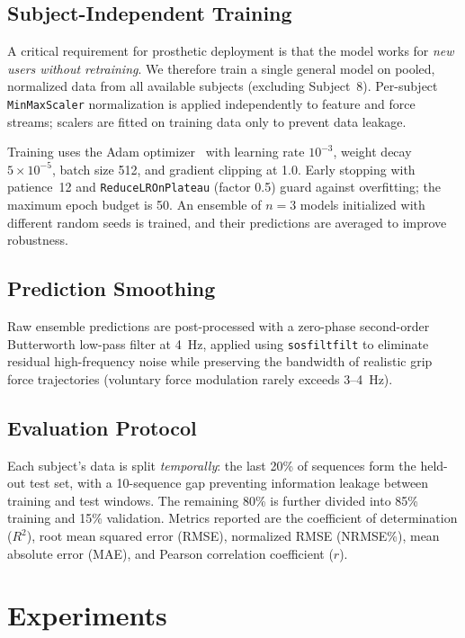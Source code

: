 \documentclass[journal]{IEEEtran}
\begin{document}
\subsection{Subject-Independent Training}

A critical requirement for prosthetic deployment is that the model works
for \emph{new users without retraining}.  We therefore train a single
general model on pooled, normalized data from all available subjects
(excluding Subject~8).  Per-subject \texttt{MinMaxScaler} normalization is
applied independently to feature and force streams; scalers are fitted on
training data only to prevent data leakage.

Training uses the Adam optimizer~\cite{kingma2014adam} with learning rate
$10^{-3}$, weight decay $5 \times 10^{-5}$, batch size 512, and gradient
clipping at 1.0.  Early stopping with patience~12 and
\texttt{ReduceLROnPlateau} (factor 0.5) guard against overfitting; the
maximum epoch budget is 50.  An ensemble of $n = 3$ models initialized with
different random seeds is trained, and their predictions are averaged to
improve robustness.

\subsection{Prediction Smoothing}

Raw ensemble predictions are post-processed with a zero-phase second-order
Butterworth low-pass filter at 4~Hz, applied using \texttt{sosfiltfilt} to
eliminate residual high-frequency noise while preserving the bandwidth of
realistic grip force trajectories (voluntary force modulation rarely exceeds
3--4~Hz).

\subsection{Evaluation Protocol}

Each subject's data is split \emph{temporally}: the last 20\% of sequences
form the held-out test set, with a 10-sequence gap preventing information
leakage between training and test windows.  The remaining 80\% is further
divided into 85\% training and 15\% validation.  Metrics reported are the
coefficient of determination ($R^2$), root mean squared error (RMSE),
normalized RMSE (NRMSE\%), mean absolute error (MAE), and Pearson
correlation coefficient ($r$).

\section{Experiments}
\label{sec:experiments}
\end{document}

